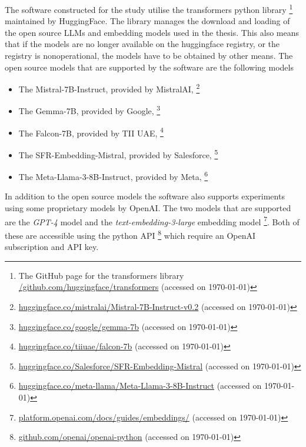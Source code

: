 The software constructed for the study utilise the transformers python library \footnote{The GitHub page for the transformers library \href{https://github.com/huggingface/transformers}{/github.com/huggingface/transformers} (accessed on \today)} maintained by HuggingFace. The library manages the download and loading of the open source \gls{LLM}s and embedding models used in the thesis. This also means that if the models are no longer available on the huggingface registry, or the registry is nonoperational, the models have to be obtained by other means. The open source models that are supported by the software are the following models


\begin{itemize}
        \item The Mistral-7B-Instruct, provided by MistralAI, \footnote{\href{https://huggingface.co/mistralai/Mistral-7B-Instruct-v0.2}{huggingface.co/mistralai/Mistral-7B-Instruct-v0.2} (accessed on \today)}
        \item The Gemma-7B, provided by Google, \footnote{\href{https://huggingface.co/google/gemma-7b}{huggingface.co/google/gemma-7b} (accessed on \today)}
        \item The Falcon-7B, provided by TII UAE, \footnote{\href{https://huggingface.co/tiiuae/falcon-7b}{huggingface.co/tiiuae/falcon-7b} (accessed on \today)}
        \item The SFR-Embedding-Mistral, provided by Salesforce, \footnote{\href{https://huggingface.co/Salesforce/SFR-Embedding-Mistral}{huggingface.co/Salesforce/SFR-Embedding-Mistral} (accessed on \today)}
        \item The Meta-Llama-3-8B-Instruct, provided by Meta, \footnote{\href{https://huggingface.co/meta-llama/Meta-Llama-3-8B-Instruct}{huggingface.co/meta-llama/Meta-Llama-3-8B-Instruct} (accessed on \today)}
\end{itemize}


In addition to the open source models the software also supports experiments using some proprietary models by OpenAI. The two models that are supported are the \textit{GPT-4} model and the \textit{text-embedding-3-large} embedding model \footnote{\href{https://platform.openai.com/docs/guides/embeddings}{platform.openai.com/docs/guides/embeddings/} (accessed on \today)}. Both of these are accessible using the python API \footnote{\href{https://github.com/openai/openai-python}{github.com/openai/openai-python} (accessed on \today)} which require an OpenAI subscription and API key.


